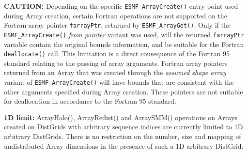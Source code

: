 
\begin{itemize}
\label{Array:rest}

\begin{sloppypar}
\item {\bf CAUTION:} Depending on the specific {\tt ESMF\_ArrayCreate()} entry point used during Array creation, certain Fortran operations are not supported on the Fortran array pointer {\tt farrayPtr}, returned by {\tt ESMF\_ArrayGet()}. Only if the {\tt ESMF\_ArrayCreate()} {\em from pointer} variant was used, will the returned {\tt farrayPtr} variable contain the original bounds information, and be suitable for the Fortran {\tt deallocate()} call. This limitation is a direct consequence of the Fortran 95 standard relating to the passing of array arguments. Fortran array pointers returned from an Array that was created through the {\em assumed shape array} variant of {\tt ESMF\_ArrayCreate()} will have bounds that are consistent with the other arguments specified during Array creation. These pointers are not suitable for deallocation in accordance to the Fortran 95 standard.
\end{sloppypar}

\item {\bf 1D limit:} ArrayHalo(), ArrayRedist() and ArraySMM() operations on Arrays created on DistGrids with arbitrary sequence indices are currently limited to 1D arbitrary DistGrids. There is no restriction on the number, size
and mapping of undistributed Array dimensions in the presence of such a 1D
arbitrary DistGrid.

\end{itemize}
